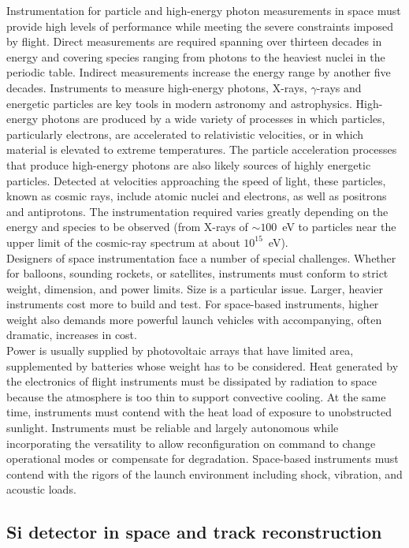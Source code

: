 Instrumentation for particle and high-energy photon measurements in space must
provide high levels of performance while meeting the severe constraints imposed
by flight. Direct measurements are required spanning over thirteen decades in
energy and covering species ranging from photons to the heaviest nuclei in the
periodic table. Indirect measurements increase the energy range by another five
decades.  Instruments to measure high-energy photons, X-rays, $\gamma$-rays and
energetic particles are key tools in modern astronomy and
astrophysics. High-energy photons are produced by a wide variety of processes in
which particles, particularly electrons, are accelerated to relativistic
velocities, or in which material is elevated to extreme temperatures. The
particle acceleration processes that produce high-energy photons are also likely
sources of highly energetic particles. Detected at velocities approaching the
speed of light, these particles, known as cosmic rays, include atomic nuclei and
electrons, as well as positrons and antiprotons. The instrumentation required
varies greatly depending on the energy and species to be observed (from X-rays
of $\sim 100$~eV to particles near the upper
limit of the cosmic-ray spectrum at about $10^{15}$~eV).\\
Designers of space instrumentation face a number of special challenges. Whether
for balloons, sounding rockets, or satellites, instruments must conform to
strict weight, dimension, and power limits. Size is a particular issue. Larger,
heavier instruments cost more to build and test. For space-based instruments,
higher weight also demands more powerful launch vehicles with accompanying,
often
dramatic, increases in cost.\\
Power is usually supplied by photovoltaic arrays that have limited area,
supplemented by batteries whose weight has to be considered. Heat generated by
the electronics of flight instruments must be dissipated by radiation to space
because the atmosphere is too thin to support convective cooling. At the same
time, instruments must contend with the heat load of exposure to unobstructed
sunlight. Instruments must be reliable and largely autonomous while
incorporating the versatility to allow reconfiguration on command to change
operational modes or compensate for degradation. Space-based instruments must
contend with the rigors of the launch environment
including shock, vibration, and acoustic loads.\\

\subsection{Si detector in space and track reconstruction}
\label{sec:tracking_spazio}

